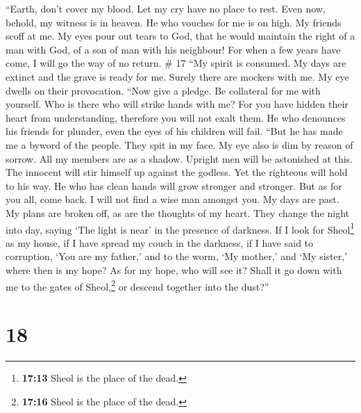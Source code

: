 ``Earth, don't cover my blood. Let my cry have no place to rest.
 Even now, behold, my witness is in heaven. He who
vouches for me is on high.  My friends scoff at me. My
eyes pour out tears to God,  that he would maintain the
right of a man with God, of a son of man with his neighbour!
 For when a few years have come, I will go the way of no
return. \# 17  ``My spirit is consumed. My days are
extinct and the grave is ready for me.  Surely there are
mockers with me. My eye dwells on their provocation. 
``Now give a pledge. Be collateral for me with yourself. Who is there
who will strike hands with me?  For you have hidden their
heart from understanding, therefore you will not exalt them.
 He who denounces his friends for plunder, even the eyes
of his children will fail.  ``But he has made me a byword
of the people. They spit in my face.  My eye also is dim
by reason of sorrow. All my members are as a shadow. 
Upright men will be astonished at this. The innocent will stir himself
up against the godless.  Yet the righteous will hold to
his way. He who has clean hands will grow stronger and stronger.
 But as for you all, come back. I will not find a wise
man amongst you.  My days are past. My plans are broken
off, as are the thoughts of my heart.  They change the
night into day, saying `The light is near' in the presence of darkness.
 If I look for Sheol\footnote{\textbf{17:13} Sheol is the
  place of the dead.} as my house, if I have spread my couch in the
darkness,  if I have said to corruption, `You are my
father,' and to the worm, `My mother,' and `My sister,' 
where then is my hope? As for my hope, who will see it? 
Shall it go down with me to the gates of Sheol,\footnote{\textbf{17:16}
  Sheol is the place of the dead.} or descend together into the dust?''

\hypertarget{section-12}{%
\section{18}\label{section-12}}

